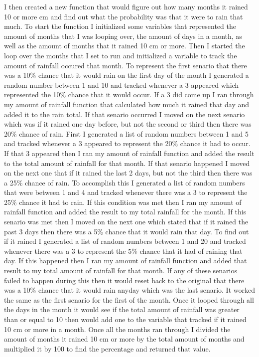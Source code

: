 \documentclass[12pt]{article}
\begin{document}
I then created a new function that would figure out how many months it rained 10 or more cm and find out what the probability was that it were to rain that much. To start the function I initialized some variables that represented the amount of months that I was looping over, the amount of days in a month, as well as the amount of months that it rained 10 cm or more. Then I started the loop over the months that I set to run and initialized a variable to track the amount of rainfall occured that month. To represent the first senario that there was a 10\% chance that it would rain on the first day of the month I generated a random number between 1 and 10 and tracked whenever a 3 appeared which represented the 10\% chance that it would occur. If a 3 did come up I ran through my amount of rainfall function that calculated how much it rained that day and added it to the rain total. If that senario occurred I moved on the next senario which was if it rained one day before, but not the second or third then there was 20\% chance of rain. First I generated a list of random numbers between 1 and 5 and tracked whenever a 3 appeared to represent the 20\% chance it had to occur. If that 3 appeared then I ran my amount of rainfall function and added the result to the total amount of rainfall for that month. If that senario happened I moved on the next one that if it rained the last 2 days, but not the third then there was  a 25\% chance of rain. To accomplish this I generated a list of random numbers that were between 1 and 4 and tracked whenever there was a 3 to represent the 25\% chance it had to rain. If this condition was met then I ran my amount of rainfall function and added the result to my total rainfall for the month. If this senario was met then I moved on the next one which stated that if it rained the past 3 days then there was a 5\% chance that it would rain that day. To find out if it rained I generated a list of random numbers between 1 and 20 and tracked whenever there was a 3 to represent the 5\% chance that it had of raining that day. If this happened then I ran my amount of rainfall function and added that result to my total amount of rainfall for that month. If any of these senarios failed to happen during this then it would reset back to the original that there was a 10\% chance that it would rain anyday which was the last senario. It worked the same as the first senario for the first of the month. Once it looped through all the days in the month it would see if the total amount of rainfall was greater than or equal to 10 then would add one to the variable that tracked if it rained 10 cm or more in a month. Once all the months ran through I divided the amount of months it rained 10 cm or more by the total amount of months and multiplied it by 100 to find the percentage and returned that value.
\end{document}

